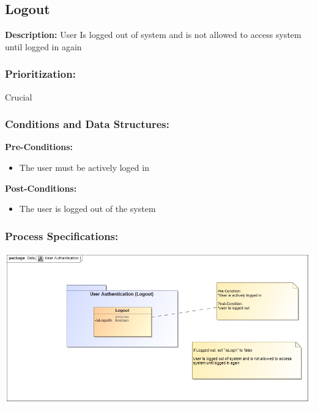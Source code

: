 \subsection{Logout}
\textbf{Description:}
User Is logged out of system and is not allowed to access system until logged in again
\subsubsection{Prioritization:}
Crucial
\subsubsection{Conditions and Data Structures:}
\textbf{Pre-Conditions:}
\begin{itemize}
	\item The user must be actively loged in
\end{itemize}
\textbf{Post-Conditions:}	
\begin{itemize}
	\item The user is logged out of the system
\end{itemize}
\subsubsection{Process Specifications:}
\includegraphics[width=1\linewidth]{./Graphics/Logout}

